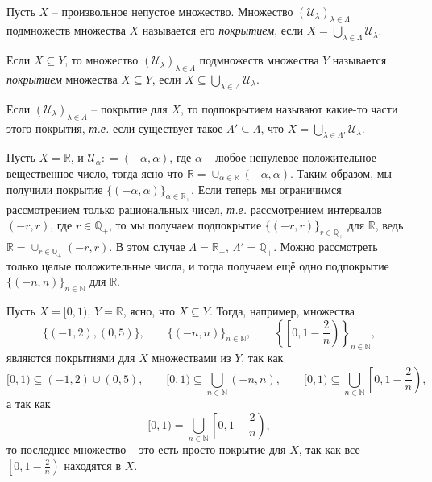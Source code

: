\begin{definition}~

Пусть $X$ -- произвольное непустое множество. Множество $(\mathscr{U}_\lambda)_{\lambda \in \Lambda}$ подмножеств множества $X$ называется его \textit{покрытием}, если $X = \bigcup_{\lambda \in \Lambda} \mathscr{U}_\lambda$.    

Если $X \subseteq Y$, то множество $(\mathscr{U}_\lambda)_{\lambda \in \Lambda}$ подмножеств множества $Y$ называется \textit{покрытием} множества $X\subseteq Y$, если $X \subseteq \bigcup_{\lambda \in \Lambda} \mathscr{U}_\lambda$.

Если $(\mathscr{U}_\lambda)_{\lambda \in \Lambda}$ -- покрытие для $X$, то подпокрытием называют какие-то части этого покрытия, \textit{т.е.} если существует такое $\Lambda' \subseteq \Lambda$, что $X = \bigcup_{\lambda \in \Lambda '}\mathscr{U}_{\lambda}$.
\end{definition}


\begin{example}
    Пусть $X = \mathbb{R}$, и $\mathscr{U}_\alpha: = (-\alpha, \alpha)$, где $\alpha$ -- любое ненулевое положительное вещественное число, тогда ясно что $\mathbb{R}  = \cup_{\alpha \in \mathbb{R}} (-\alpha, \alpha)$. Таким образом, мы получили покрытие $\{(-\alpha ,\alpha)\}_{\alpha \in \mathbb{R}_+}$. Если теперь мы ограничимся рассмотрением только рациональных чисел, \textit{т.е.} рассмотрением интервалов $(-r, r)$, где $r \in \mathbb{Q}_+$, то мы получаем подпокрытие $\{(-r, r)\}_{r\in \mathbb{Q}_+}$ для $\mathbb{R}$, ведь $\mathbb{R} = \cup_{r\in \mathbb{Q}_+}(-r,r)$. В этом случае $\Lambda = \mathbb{R}_+$, $\Lambda'= \mathbb{Q}_+$. Можно рассмотреть только целые положительные числа, и тогда получаем ещё одно подпокрытие $\{(-n,n)\}_{n \in \mathbb{N}}$ для $\mathbb{R}$.
\end{example}


\begin{example}
    Пусть $X = [0,1)$, $Y = \mathbb{R}$, ясно, что $X \subseteq Y$. Тогда, например, множества
   \[
   \{(-1,2), (0,5)\},\qquad  \{(-n,n)\}_{n \in \mathbb{N}}, \qquad \left\{\left[0,1-\frac{2}{n}\right)\right\}_{n \in \mathbb{N}},  
   \] 
являются покрытиями для $X$ множествами из $Y$, так как
\[
 [0,1) \subseteq (-1,2) \cup (0,5), \qquad [0,1) \subseteq \bigcup_{n \in \mathbb{N}} (-n,n), \qquad [0,1) \subseteq \bigcup_{n \in \mathbb{N}}\left[0,1-\frac{2}{n}\right),
\]
а так как 
\[
 [0,1) = \bigcup_{n \in \mathbb{N}}\left[0,1-\frac{2}{n}\right),
\]
то последнее множество -- это есть просто покрытие для $X$, так как все $\left[0,1-\frac{2}{n}\right)$ находятся в $X$.
\end{example}


